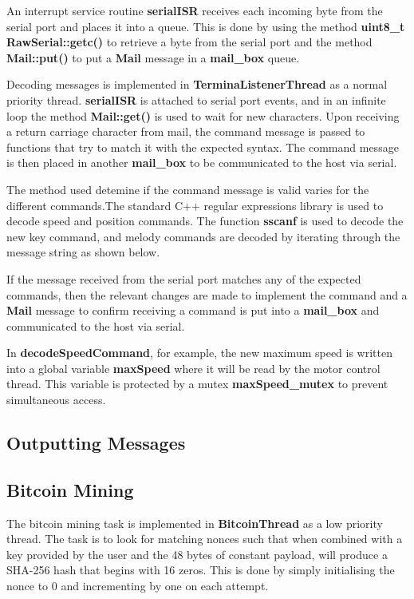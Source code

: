 \documentclass{article}
\begin{document}
\noindent
An interrupt service routine \textbf{serialISR} receives each incoming byte from the serial port and places it into a queue. This is done by using the method \textbf{uint8\_t RawSerial::getc()} to retrieve a byte from the serial port and the method \textbf{Mail::put()} to put a \textbf{Mail} message in a \textbf{mail\_box} queue.
\bigskip

\noindent
Decoding messages is implemented in \textbf{TerminaListenerThread} as a normal priority thread. \textbf{serialISR} is attached to serial port events, and in an infinite loop the method \textbf{Mail::get()} is used to wait for new characters. Upon receiving a return carriage character from mail, the command message is passed to functions that try to match it with the expected syntax. The command message is then placed in another \textbf{mail\_box} to be communicated to the host via serial.

\bigskip

\bigskip

\noindent
The method used detemine if the command message is valid varies for the different commands.The standard C++ regular expressions library is used to decode speed and position commands. The function \textbf{sscanf} is used to decode the new key command, and melody commands are decoded by iterating through the message string as shown below.

\bigskip

\bigskip
If the message received from the serial port matches any of the expected commands, then the relevant changes are made to implement the command and a \textbf{Mail} message to confirm receiving a command is put into a \textbf{mail\_box} and communicated to the host via serial.
\bigskip


\noindent
In \textbf{decodeSpeedCommand}, for example, the new maximum speed is written into a global variable \textbf{maxSpeed} where it will be read by the motor control thread. This variable is protected by a mutex \textbf{maxSpeed\_mutex} to prevent simultaneous access.


\subsection{Outputting Messages}

\subsection{Bitcoin Mining}

\noindent
The bitcoin mining task is implemented in \textbf{BitcoinThread} as a low priority thread. The task is to look for matching nonces such that when combined with a key provided by the user and the 48 bytes of constant payload, will produce a SHA-256 hash that begins with 16 zeros. This is done by simply initialising the nonce to 0 and incrementing by one on each attempt.
\end{document}
